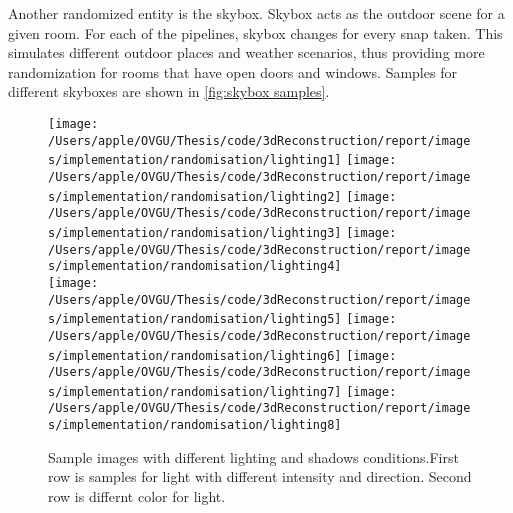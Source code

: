 Another randomized entity is the skybox.
Skybox acts as the outdoor scene for a given room.
For each of the pipelines, skybox changes for every snap taken.
This simulates different outdoor places and weather scenarios, thus providing more randomization for rooms that have open doors and windows.
Samples for different skyboxes are shown in \autoref{fig:skybox samples}.


\begin{figure}
    \centering
        \texttt{[image: /Users/apple/OVGU/Thesis/code/3dReconstruction/report/images/implementation/randomisation/lighting1]}
        \texttt{[image: /Users/apple/OVGU/Thesis/code/3dReconstruction/report/images/implementation/randomisation/lighting2]}
        \texttt{[image: /Users/apple/OVGU/Thesis/code/3dReconstruction/report/images/implementation/randomisation/lighting3]}
        \texttt{[image: /Users/apple/OVGU/Thesis/code/3dReconstruction/report/images/implementation/randomisation/lighting4]}\\
    \vspace{0.1cm}
        \texttt{[image: /Users/apple/OVGU/Thesis/code/3dReconstruction/report/images/implementation/randomisation/lighting5]}
        \texttt{[image: /Users/apple/OVGU/Thesis/code/3dReconstruction/report/images/implementation/randomisation/lighting6]}
        \texttt{[image: /Users/apple/OVGU/Thesis/code/3dReconstruction/report/images/implementation/randomisation/lighting7]}
        \texttt{[image: /Users/apple/OVGU/Thesis/code/3dReconstruction/report/images/implementation/randomisation/lighting8]}\\
    \caption{Sample images with different lighting and shadows conditions.First row is samples for light with different intensity and direction. Second row is differnt color for light.}
    \label{fig:Lighting and shadows}
\end{figure}


